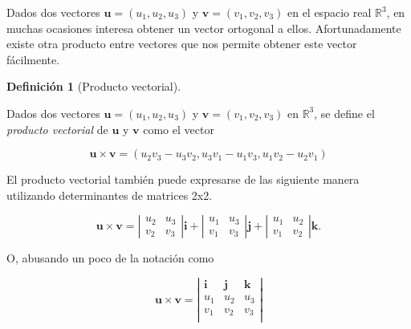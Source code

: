\documentclass[
  a4paper,
]{scrreport}
\theoremstyle{definition}
\theoremstyle{plain}
\theoremstyle{definition}
\newtheorem{definition}{Definición}[chapter]
\theoremstyle{definition}
\theoremstyle{plain}
\theoremstyle{plain}
\theoremstyle{remark}
\begin{document}
Dados dos vectores \(\mathbf{u}=(u_1,u_2,u_3)\) y
\(\mathbf{v}=(v_1,v_2,v_3)\) en el espacio real \(\mathbb{R}^3\), en
muchas ocasiones interesa obtener un vector ortogonal a ellos.
Afortunadamente existe otra producto entre vectores que nos permite
obtener este vector fácilmente.

\begin{definition}[Producto
vectorial]\protect\hypertarget{def-producto-vectorial}{}\label{def-producto-vectorial}

Dados dos vectores \(\mathbf{u}=(u_1,u_2,u_3)\) y
\(\mathbf{v}=(v_1,v_2,v_3)\) en \(\mathbb{R}^3\), se define el
\emph{producto vectorial} de \(\mathbf{u}\) y \(\mathbf{v}\) como el
vector

\[
\mathbf{u}\times \mathbf{v} = (u_2v_3-u_3v_2, u_3v_1-u_1v_3, u_1v_2-u_2v_1)
\]

\end{definition}

El producto vectorial también puede expresarse de las siguiente manera
utilizando determinantes de matrices 2x2.

\[
\mathbf{u}\times \mathbf{v} = 
\left|
\begin{array}{cc}
u_2 & u_3 \\
v_2 & v_3 
\end{array}
\right|\mathbf{i} +
\left|
\begin{array}{cc}
u_1 & u_3 \\
v_1 & v_3 
\end{array}
\right|\mathbf{j} +
\left|
\begin{array}{cc}
u_1 & u_2 \\
v_1 & v_2 
\end{array}
\right|\mathbf{k}.
\]

O, abusando un poco de la notación como

\[
\mathbf{u}\times \mathbf{v} = 
\left|
\begin{array}{ccc}
\mathbf{i} & \mathbf{j} & \mathbf{k}\\
u_1 & u_2 & u_3\\
v_1 & v_2 & v_3\\
\end{array}
\right|
\]
\end{document}
